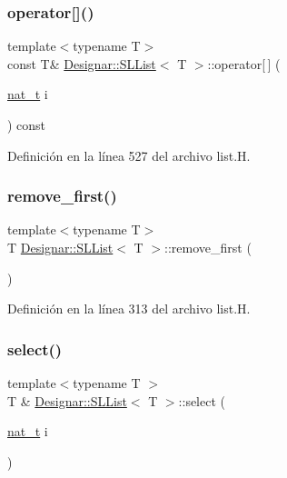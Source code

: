 \subsubsection{\texorpdfstring{operator[]()}{operator[]()}\hspace{0.1cm}{\footnotesize\ttfamily [2/2]}}
{\footnotesize\ttfamily template$<$typename T$>$ \\
const T\& \hyperlink{class_designar_1_1_s_l_list}{Designar\+::\+S\+L\+List}$<$ T $>$\+::operator\mbox{[}$\,$\mbox{]} (\begin{DoxyParamCaption}\item[{\hyperlink{namespace_designar_aa72662848b9f4815e7bf31a7cf3e33d1}{nat\+\_\+t}}]{i }\end{DoxyParamCaption}) const\hspace{0.3cm}{\ttfamily [inline]}}



Definición en la línea 527 del archivo list.\+H.

\mbox{\label{class_designar_1_1_s_l_list_aedf1d4b4e8134748796a56e7d4ac9d11}} 
\subsubsection{\texorpdfstring{remove\+\_\+first()}{remove\_first()}}
{\footnotesize\ttfamily template$<$typename T$>$ \\
T \hyperlink{class_designar_1_1_s_l_list}{Designar\+::\+S\+L\+List}$<$ T $>$\+::remove\+\_\+first (\begin{DoxyParamCaption}{ }\end{DoxyParamCaption})\hspace{0.3cm}{\ttfamily [inline]}}



Definición en la línea 313 del archivo list.\+H.

\mbox{\label{class_designar_1_1_s_l_list_a5f9a0e22a762f23ab48db2e4d59d1a38}} 
\subsubsection{\texorpdfstring{select()}{select()}\hspace{0.1cm}{\footnotesize\ttfamily [1/2]}}
{\footnotesize\ttfamily template$<$typename T $>$ \\
T \& \hyperlink{class_designar_1_1_s_l_list}{Designar\+::\+S\+L\+List}$<$ T $>$\+::select (\begin{DoxyParamCaption}\item[{\hyperlink{namespace_designar_aa72662848b9f4815e7bf31a7cf3e33d1}{nat\+\_\+t}}]{i }\end{DoxyParamCaption})}



